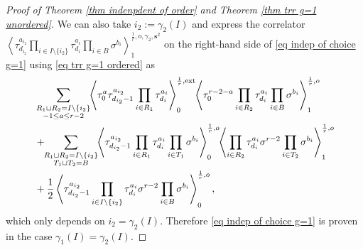 \documentclass[11pt]{amsart}
\theoremstyle{definition}
\theoremstyle{remark}
\newcommand{\consta}{{\frac{1}{2}}}
\newcommand{\<}{\left<}
\renewcommand{\>}{\right>}
\numberwithin{equation}{section}
\begin{document}
\begin{proof}[Proof of Theorem \ref{thm indenpdent of order} and Theorem \ref{thm trr g=1 unordered}]
    We can also take $i_2:=\gamma_2(I)$ and express the %
correlator 
    $\left\langle \tau_{d_{i_2}}^{a_{i_2}}\prod_{i\in I\setminus \{i_2\}}\tau^{a_i}_{d_i}\prod_{i\in B}\sigma^{b_i}\right\rangle^{\frac{1}{r},o,\gamma_2,\bm{s}^2}_1$ on %
the right-hand side of \eqref{eq indep of choice g=1} using \eqref{eq trr g=1 ordered} as
    \begin{equation}\label{eq apply trr D>1 v2}
        \begin{split}
    &\sum_{\substack{R_1 \sqcup R_2 = I\setminus\{i_2\}\\ -1\le a \le r-2}}\hspace{-0.1cm}\left\langle \tau_0^{a}\tau_{d_{i_2}-1}^{a_{i_2}}\prod_{i \in R_1}\tau_{d_i}^{a_i}\right\rangle^{\frac{1}{r},\text{ext}}_0
    \hspace{-0.1cm}\left\langle \tau_0^{r-2-a}\prod_{i\in R_2}\tau^{a_i}_{d_i}\prod_{i\in B}\sigma^{b_i}\right\rangle^{\frac{1}{r},o}_1\\
    &+\hspace{-0.1cm}\sum_{\substack{R_1 \sqcup R_2 =  I\setminus\{i_2\} \\ T_1 \sqcup T_2 =  B}} \hspace{-0.1cm} \left\langle \tau^{a_{i_2}}_{d_{i_2}-1}\prod_{i \in R_1} \tau^{a_i}_{d_i}\prod_{i\in T_1}\sigma^{b_i}\right\rangle^{\frac{1}{r},o}_0 \hspace{-0.1cm}\left\langle \prod_{i \in R_2} \tau^{a_i}_{d_i} \sigma^{r-2}\prod_{i\in T_2}\sigma^{b_i}\right\rangle^{\frac{1}{r}, o}_1\\
    &+\consta\left\langle \tau^{a_{i_2}}_{d_{i_2}-1}\prod_{i\in I\setminus \{i_2\}}\tau^{a_i}_{d_i}\sigma^{r-2}\prod_{i\in B}\sigma^{b_i}\right\rangle^{\frac{1}{r},o}_0,
    \end{split}
    \end{equation}
    which only depends on $i_2=\gamma_2(I)$. Therefore \eqref{eq indep of choice g=1} is proven in the case $\gamma_1(I)=\gamma_2(I)$.


\end{proof}
\end{document}
